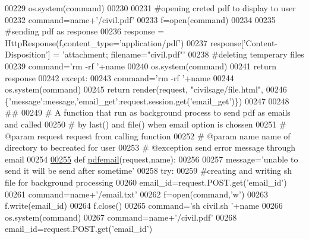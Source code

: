 \begin{DoxyCode}
00229             os.system(command)
00230 
00231             \textcolor{comment}{#opening creted pdf to display to user}
00232             command=name+\textcolor{stringliteral}{'/civil.pdf'}
00233             f=open(command)
00234 
00235             \textcolor{comment}{#sending pdf as response}
00236             response = HttpResponse(f,content\_type=\textcolor{stringliteral}{'application/pdf'})
00237             response[\textcolor{stringliteral}{'Content-Disposition'}] = \textcolor{stringliteral}{'attachment; filename="civil.pdf"'}
00238             \textcolor{comment}{#deleting temperary files}
00239             command=\textcolor{stringliteral}{'rm -rf '}+name
00240             os.system(command)
00241             \textcolor{keywordflow}{return} response
00242     \textcolor{keywordflow}{except}:
00243         command=\textcolor{stringliteral}{'rm -rf '}+name
00244         os.system(command)
00245         \textcolor{keywordflow}{return} render(request, \textcolor{stringliteral}{"civilsage/file.html"},
00246         \{\textcolor{stringliteral}{'message'}:message,\textcolor{stringliteral}{'email\_get'}:request.session.get(\textcolor{stringliteral}{'email\_get'})\})
00247 
00248 \textcolor{comment}{##}
00249 \textcolor{comment}{# A function that run as background process to send pdf as emails and called}
00250 \textcolor{comment}{# by last() and file() when email option is chossen}
00251 \textcolor{comment}{# @param request request from calling function }
00252 \textcolor{comment}{# @param name name of directory to becreated for user}
00253 \textcolor{comment}{# @exception send error message through email }
00254 
\hypertarget{views_8py_source_l00255}{}\hyperlink{namespacecivilsage_1_1views_a9914ff19f8e15ccab1a07eaeac8cfb21}{00255} \textcolor{keyword}{def }\hyperlink{namespacecivilsage_1_1views_a9914ff19f8e15ccab1a07eaeac8cfb21}{pdfemail}(request,name):
00256 
00257     message=\textcolor{stringliteral}{'unable to send it will be send after sometime'}
00258     \textcolor{keywordflow}{try}:
00259         \textcolor{comment}{#creating and writing sh file for background processing}
00260         email\_id=request.POST.get(\textcolor{stringliteral}{'email\_id'})
00261         command=name+\textcolor{stringliteral}{'/email.txt'}
00262         f=open(command,\textcolor{stringliteral}{'w'})
00263         f.write(email\_id)
00264         f.close()
00265         command=\textcolor{stringliteral}{'sh  civil.sh '}+name
00266         os.system(command)
00267         command=name+\textcolor{stringliteral}{'/civil.pdf'}
00268         email\_id=request.POST.get(\textcolor{stringliteral}{'email\_id'})

\end{DoxyCode}
